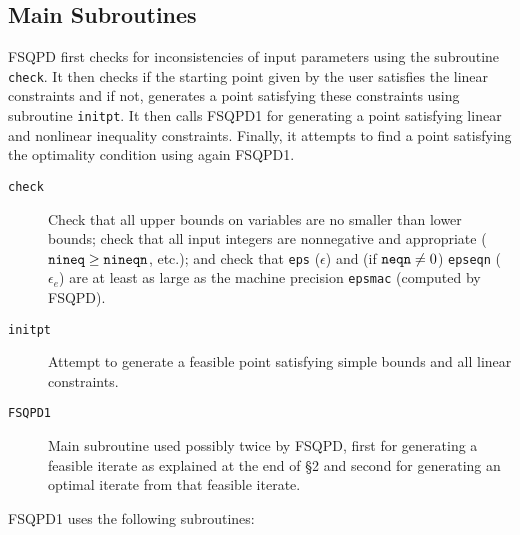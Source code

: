 \subsection{Main Subroutines}
FSQPD first checks for inconsistencies of input parameters using the 
subroutine {\tt check}. It then checks if the starting 
point given by the user satisfies the linear 
constraints and if not, generates a point 
satisfying these constraints using
subroutine {\tt initpt}. It then calls FSQPD1 for generating a point
satisfying linear and nonlinear inequality constraints. Finally, 
it attempts to find
a point satisfying the optimality condition using again FSQPD1.
\begin{description}
\item[\tt check] Check that all upper bounds on variables 
                 are no smaller than lower bounds; 
                 check that all input integers are nonnegative
                 and appropriate (${\tt nineq} \geq {\tt nineqn}$, etc.);
                 and check that {\tt eps} ($\epsilon$) 
                 and (if ${\tt neqn}\ne 0$) {\tt epseqn} 
                 ($\epsilon_e$) are at least as large as 
                 the machine precision {\tt epsmac} (computed by FSQPD).
\item[\tt initpt] Attempt to generate a feasible point satisfying 
                 simple bounds and all linear constraints.
\item[\tt FSQPD1] Main subroutine used possibly twice by FSQPD, 
                  first for generating
                  a feasible iterate as explained at the 
                  end of \S 2 and
                  second for generating an optimal iterate 
                  from that feasible iterate.
\end{description}
FSQPD1 uses the following subroutines:

